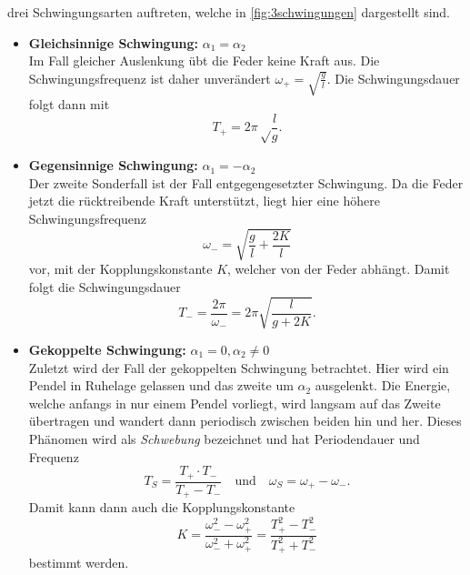 drei Schwingungsarten auftreten, welche in \autoref{fig:3schwingungen} dargestellt sind.
\begin{itemize}
	\item \textbf{Gleichsinnige Schwingung:} $\alpha_1 = \alpha_2$ \\
		Im Fall gleicher Auslenkung übt die Feder keine Kraft aus. Die
		Schwingungsfrequenz ist daher unverändert $\omega_+ = \sqrt{\frac{g}{l}}$.
		Die Schwingungsdauer folgt dann mit
		\begin{equation}
			T_+ = 2\pi \sqrt\frac{l}{g}.
			\label{eqn:T_+}
		\end{equation}
	\item \textbf{Gegensinnige Schwingung:} $\alpha_1 = -\alpha_2$ \\
		Der zweite Sonderfall ist der Fall entgegengesetzter Schwingung. Da die
		Feder jetzt die rücktreibende Kraft unterstützt, liegt hier eine höhere
		Schwingungsfrequenz 
		\[
			\omega_- = \sqrt{\frac gl + \frac{2K}{l}}
		\]
		vor, mit der Kopplungskonstante $K$, welcher von der Feder abhängt. 
		Damit folgt die Schwingungsdauer
		\begin{equation}
			T_- = \frac{2\pi}{\omega_-} = 2\pi \sqrt{\frac{l}{g+2K}}. \label{eqn:t-}
		\end{equation}
	\item \textbf{Gekoppelte Schwingung:} $\alpha_1 = 0, \alpha_2 \neq 0$ \\
		Zuletzt wird der Fall der gekoppelten Schwingung betrachtet. Hier wird ein
		Pendel in Ruhelage gelassen und das zweite um $\alpha_2$ ausgelenkt. Die
		Energie, welche anfangs in nur einem Pendel vorliegt, wird langsam auf das
		Zweite übertragen und wandert dann periodisch zwischen beiden hin und her.
		Dieses Phänomen wird als \textit{Schwebung} bezeichnet und hat
		Periodendauer und Frequenz
		\begin{equation}
			\label{eqn:ts}
			T_S = \frac{T_+ \cdot T_-}{T_+ - T_-}
			\quad
			\text{und}
			\quad
			\omega_S = \omega_+ - \omega_-.
		\end{equation}
		Damit kann dann auch die Kopplungskonstante 
		\begin{equation}
			K = \frac{\omega_-^2 - \omega_+^2}{\omega_-^2 + \omega_+^2}
			=\frac{T_+^2 - T_-^2}{T_+^2 + T_-^2}
			\label{eqn:kopplungskonstante}
		\end{equation}
		bestimmt werden.
\end{itemize}
